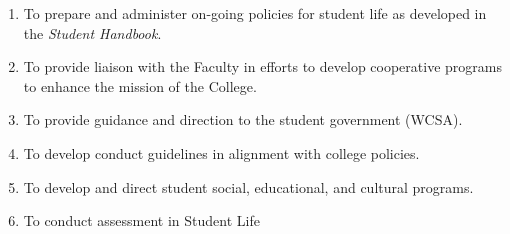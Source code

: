 \begin{enumerate}
{\begin{enumerate}
{\begin{enumerate}
										\item{To prepare and administer on-going policies for student life as developed in the \emph{Student Handbook}.}
										\item{To provide liaison with the Faculty in efforts to develop cooperative programs to enhance the mission of the College.}
										\item{To provide guidance and direction to the student government (WCSA).}
										\item{To develop conduct guidelines in alignment with college policies.}
										\item{To develop and direct student social, educational, and cultural programs.}
										\item{To conduct assessment in Student Life}
									\end{enumerate}
								}
							\end{enumerate}
						}
					\end{enumerate}

